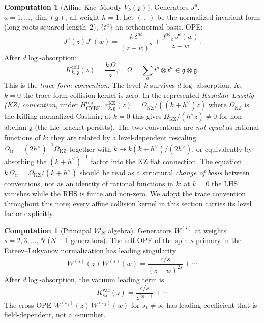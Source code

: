 \documentclass[11pt,reqno]{amsart}
\theoremstyle{definition}
\newtheorem{computation}[theorem]{Computation}
\theoremstyle{remark}
\newcommand{\cW}{\mathcal{W}}
\newcommand{\fg}{\mathfrak{g}}
\numberwithin{equation}{section}
\begin{document}
\begin{computation}[Affine Kac--Moody $V_k(\fg)$]
\label{comp:r-km}
Generators $J^a$, $a = 1,\ldots,\dim(\fg)$, all weight
$h = 1$. Let $(\ ,\ )$ be the normalized invariant form
(long roots squared length~$2$), $\{t^a\}$ an orthonormal
basis. OPE:
\[
J^a(z)J^b(w) = \frac{k\,\delta^{ab}}{(z-w)^2}
 + \frac{f^{ab}{}_c\,J^c(w)}{z-w}.
\]
After $d\log$-absorption:
\begin{equation}\label{eq:r-km}
\boxed{\;K_{k,\fg}^{\mathrm{coll}}(z) = \frac{k\,\Omega}{z},\quad
 \Omega = \sum_a t^a \otimes t^a \in \fg\otimes\fg.\;}
\end{equation}
This is the \emph{trace-form convention}. The level~$k$
survives $d\log$-absorption. At $k=0$ the trace-form collision kernel
is zero.  In the represented \emph{Kazhdan--Lusztig (KZ) convention},
under $H_{\mathrm{CYBE}}^{\mathrm{rep}}$,
$r_{k,\fg}^{\mathrm{KZ}}(z)=\Omega_{\mathrm{KZ}}/((k+h^\vee)z)$
where $\Omega_{\mathrm{KZ}}$ is the Killing-normalized Casimir;
at $k = 0$ this gives $\Omega_{\mathrm{KZ}}/(h^\vee z) \neq 0$
for non-abelian $\fg$ (the Lie bracket persists). The two
conventions are \emph{not equal} as rational functions of $k$:
they are related by a level-dependent rescaling
$\Omega_{\mathrm{tr}} = (2 h^\vee)^{-1}\Omega_{\mathrm{KZ}}$
together with $k \mapsto k(k+h^\vee)/(2h^\vee)$, or
equivalently by absorbing the $(k+h^\vee)^{-1}$ factor into
the KZ flat connection. The equation
$k\,\Omega_{\mathrm{tr}} = \Omega_{\mathrm{KZ}}/(k+h^\vee)$
should be read as a structural \emph{change of basis} between
conventions, not as an identity of rational functions in $k$:
at $k=0$ the LHS vanishes while the RHS is finite and non-zero.
We adopt the trace convention throughout this note; every affine
collision kernel in this section carries its level factor explicitly.
\end{computation}

\begin{computation}[Principal $\cW_N$ algebra]
\label{comp:r-wn}
Generators $W^{(s)}$ at weights $s = 2,3,\ldots,N$
($N-1$ generators). The self-OPE of the spin-$s$ primary
in the Fateev--Lukyanov normalization has leading singularity
\[
W^{(s)}(z)\,W^{(s)}(w) = \frac{c/s}{(z-w)^{2s}} + \cdots
\]
After $d\log$-absorption, the vacuum leading term is
\begin{equation}\label{eq:r-wn}
K_{ss}^{\mathrm{vac}}(z) = \frac{c/s}{z^{2s-1}} + \cdots
\end{equation}
The cross-OPE $W^{(s_1)}(z)\,W^{(s_2)}(w)$ for $s_1 \neq s_2$
has leading coefficient that is field-dependent, not a $c$-number.
\end{computation}
\end{document}
